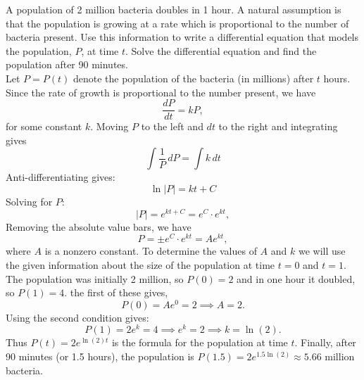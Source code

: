 \documentclass[handout]{ximera}
\begin{document}
\begin{example}[example 5]
A population of 2 million bacteria doubles in 1 hour. A natural assumption is that the population is growing at a rate which is proportional to the number of bacteria present. Use this information to
write a differential equation that models the population, $P$, at time $t$. Solve the differential equation and find the population after 90 minutes.\\
Let $P = P(t)$ denote the population of the bacteria (in millions) after $t$ hours.
Since the rate of growth is proportional to the number present, we have
\[
\frac{dP}{dt} = k P,
\]
for some constant $k$.
Moving $P$ to the left and $dt$ to the right and integrating gives
\[
\int \frac{1}{P}\, dP = \int k \, dt
\]
Anti-differentiating gives:
\[
\ln|P| = kt + C
\]
Solving for $P$:
\[
|P| = e^{kt+C} = e^C \cdot e^{kt},
\]
Removing the absolute value bars, we have
\[
P = \pm e^C \cdot e^{kt} = Ae^{kt},
\]
where $A$ is a nonzero constant.
To determine the values of $A$ and $k$ we will use the given information about the size of the population at time $t = 0$ and $t = 1$.
The population was initially 2 million, so $P(0) = 2$ and in one hour it doubled, so $P(1) = 4$. the first of these gives,
\[
P(0) = Ae^{0} = 2 \implies A = 2.
\]
Using the second condition gives:
\[
P(1) = 2e^k = 4 \implies e^k = 2 \implies k = \ln(2).
\]
Thus $P(t) = 2e^{\ln(2)t}$ is the formula for the population at time $t$. Finally, after 90 minutes (or 1.5 hours), the population is 
$P(1.5) = 2e^{1.5\ln(2)} \approx 5.66$ million bacteria.

\end{example}
\end{document}

